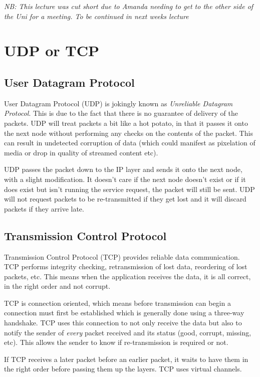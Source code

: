
\textit{NB: This lecture was cut short due to Amanda needing to get to the other side of the Uni for a meeting. To be continued in next weeks lecture}


\section{UDP or TCP}
\subsection{User Datagram Protocol}
User Datagram Protocol (UDP) is jokingly known as \textit{Unreliable Datagram Protocol}. This is due to the fact that there is no guarantee of delivery of the packets. UDP will treat packets a bit like a hot potato, in that it passes it onto the next node without performing any checks on the contents of the packet. This can result in undetected corruption of data (which could manifest as pixelation of media or drop in quality of streamed content etc).

UDP passes the packet down to the IP layer and sends it onto the next node, with a slight modification. It doesn't care if the next node doesn't exist or if it does exist but isn't running the service request, the packet will still be sent. UDP will not request packets to be re-transmitted if they get lost and it will discard packets if they arrive late.

\subsection{Transmission Control Protocol}
Transmission Control Protocol (TCP) provides reliable data communication. TCP performs integrity checking, retransmission of lost data, reordering of lost packets, etc. This means when the application receives the data, it is all correct, in the right order and not corrupt.

TCP is connection oriented, which means before transmission can begin a connection must first be established which is generally done using a three-way handshake. TCP uses this connection to not only receive the data but also to notify the sender of \textit{every} packet received and its status (good, corrupt, missing, etc). This allows the sender to know if re-transmission is required or not. 

If TCP receives a later packet before an earlier packet, it waits to have them in the right order before passing them up the layers. TCP uses virtual channels. 

